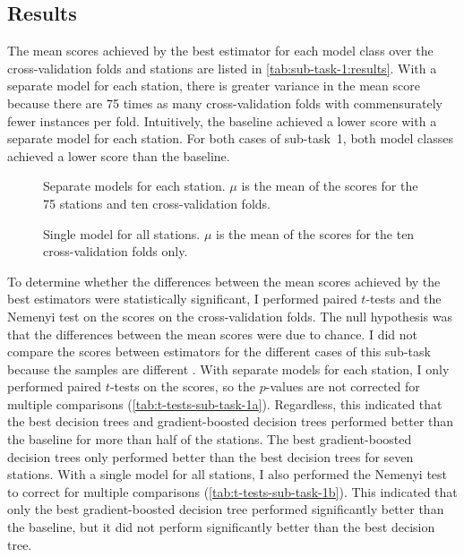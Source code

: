 \subsection{Results}
\label{sec:sub-task-1:results}

The mean scores achieved by the best estimator for each model class over the
cross-validation folds and stations are listed in \cref{tab:sub-task-1:results}.
With a separate model for each station, there is greater variance in the mean score
because there are 75 times as many cross-validation folds with commensurately fewer
instances per fold.
Intuitively, the baseline achieved a lower score with a separate model for each
station.
For both cases of sub-task~1, both model classes achieved a lower score than the
baseline.

\begin{table}
  \centering
  \begin{subfigure}{\textwidth}
    \centering
    
    \caption{Separate models for each station. $\mu$ is the mean of the scores for the
      75 stations and ten cross-validation folds.}
    \label{tab:results-sub-task-1a}
  \end{subfigure}
  \subfigurespace
  \begin{subfigure}{\textwidth}
    \centering
    
    \caption{Single model for all stations. $\mu$ is the mean of the scores for the ten
      cross-validation folds only.}
    \label{tab:sub-task-1:results-2}
  \end{subfigure}
  \caption{The mean scores and variances of the best estimators for each model
    class on the data provided for sub-task~1, and the corresponding score on the
    held-out test set (\cref{sec:task-description}).
    The best scores on each dataset are underlined.
  }
  \label{tab:sub-task-1:results}
\end{table}

To determine whether the differences between the mean scores achieved by the best
estimators were statistically significant, I performed paired $t$-tests and the Nemenyi
test on the scores on the cross-validation folds.
The null hypothesis was that the differences between the mean scores were due to
chance.
I did not compare the scores between estimators for the different cases of this
sub-task because the samples are different \parencite[354]{Flach2012}.
With separate models for each station, I only performed paired $t$-tests on the scores,
so the $p$-values are not corrected for multiple comparisons
(\cref{tab:t-tests-sub-task-1a}).
Regardless, this indicated that the best decision trees and gradient-boosted decision
trees performed better than the baseline for more than half of the stations.
The best gradient-boosted decision trees only performed better than the best decision
trees for seven stations.
With a single model for all stations, I also performed the Nemenyi test to correct for
multiple comparisons (\cref{tab:t-tests-sub-task-1b}).
This indicated that only the best gradient-boosted decision tree performed
significantly better than the baseline, but it did not perform significantly better
than the best decision tree.


